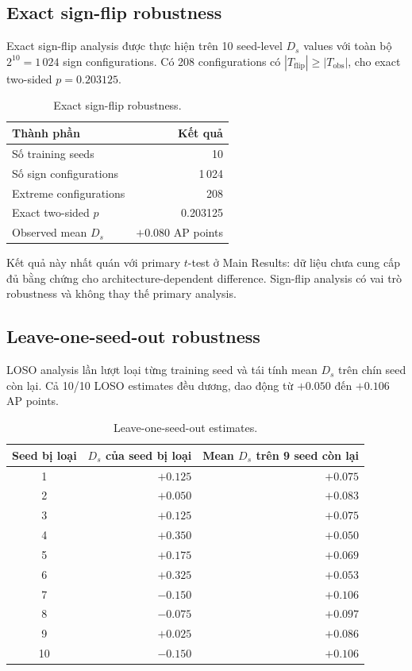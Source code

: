 \documentclass[pdflatex,sn-mathphys-num]{sn-jnl}%
\theoremstyle{thmstyleone}%
\theoremstyle{thmstyletwo}%
\theoremstyle{thmstylethree}%
\begin{document}
\subsection{Exact sign-flip robustness}

Exact sign-flip analysis được thực hiện trên 10 seed-level $D_s$ values với toàn bộ $2^{10}=1\,024$ sign configurations. Có 208 configurations có $|T_{\mathrm{flip}}|\ge |T_{\mathrm{obs}}|$, cho exact two-sided $p=0.203125$.

\begin{table}[htbp]
\centering
\caption{Exact sign-flip robustness.}
\label{tab:supp_sq3_signflip}
\small
\begin{tabular}{lr}
\toprule
\textbf{Thành phần} & \textbf{Kết quả}\\
\midrule
Số training seeds & 10\\
Số sign configurations & 1\,024\\
Extreme configurations & 208\\
Exact two-sided $p$ & 0.203125\\
Observed mean $D_s$ & $+0.080$ AP points\\
\bottomrule
\end{tabular}
\end{table}

Kết quả này nhất quán với primary $t$-test ở Main Results: dữ liệu chưa cung cấp đủ bằng chứng cho architecture-dependent difference. Sign-flip analysis có vai trò robustness và không thay thế primary analysis.

\subsection{Leave-one-seed-out robustness}

LOSO analysis lần lượt loại từng training seed và tái tính mean $D_s$ trên chín seed còn lại. Cả 10/10 LOSO estimates đều dương, dao động từ $+0.050$ đến $+0.106$ AP points.

\begin{table}[htbp]
\centering
\caption{Leave-one-seed-out estimates.}
\label{tab:supp_sq3_loso}
\small
\begin{tabular}{crr}
\toprule
\textbf{Seed bị loại} & \textbf{$D_s$ của seed bị loại} & \textbf{Mean $D_s$ trên 9 seed còn lại}\\
\midrule
1 & $+0.125$ & $+0.075$\\
2 & $+0.050$ & $+0.083$\\
3 & $+0.125$ & $+0.075$\\
4 & $+0.350$ & $+0.050$\\
5 & $+0.175$ & $+0.069$\\
6 & $+0.325$ & $+0.053$\\
7 & $-0.150$ & $+0.106$\\
8 & $-0.075$ & $+0.097$\\
9 & $+0.025$ & $+0.086$\\
10 & $-0.150$ & $+0.106$\\
\bottomrule
\end{tabular}
\end{table}
\end{document}
